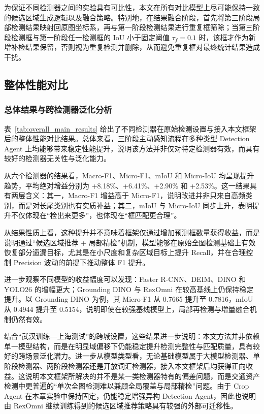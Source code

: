 为保证不同检测器之间的实验具有可比性，本文在所有对比模型上尽可能保持一致的候选区域生成逻辑以及融合策略。特别地，在结果融合阶段，首先将第三阶段局部检测结果映射回原图坐标系，再与第一阶段检测结果进行重复框筛除；当第三阶段检测框与第一阶段任一检测框的 IoU 小于固定阈值 $\tau_f=0.1$ 时，该框才作为新增补检结果保留，否则视为重复检测并删除，从而避免重复框对最终统计结果造成干扰。

\subsection{整体性能对比}
\label{sec:overall_comparison}

\subsubsection{总体结果与跨检测器泛化分析}

表~\ref{tab:overall_main_results} 给出了不同检测器在原始检测设置与接入本文框架后的整体性能对比结果。总体来看，三阶段主动感知流程在多种类型 Detection Agent 上均能够带来稳定性能提升，说明该方法并非仅对特定检测器有效，而具有较好的检测器无关性与泛化能力。

从六个检测器的结果看，Macro-F1、Micro-F1、mIoU 和 Micro-IoU 均呈现提升趋势，平均绝对增益分别为 +8.18\%、+6.41\%、+2.90\% 和 +2.53\%。这一结果具有两层含义：其一，Macro-F1 增益高于 Micro-F1，说明改进并非只来自高频类别，而是对长尾类别也有实质补益；其二，mIoU 与 Micro-IoU 同步上升，表明提升不仅体现在“检出来更多”，也体现在“框匹配更合理”。

从结果性质上看，这种提升并不意味着框架仅通过增加预测框数量获得收益，而是说明通过“候选区域推荐 + 局部精检”机制，模型能够在原始全图检测基础上有效恢复部分遗漏目标，尤其是在小尺度和复杂区域目标上提升 Recall，并在合理控制 Precision 波动的前提下推动整体 F1 提升。

进一步观察不同模型的收益幅度可以发现：Faster R-CNN、DEIM、DINO 和 YOLO26 的增幅更大；Grounding DINO 与 RexOmni 在较高基线上仍保持稳定提升。以 Grounding DINO 为例，其 Micro-F1 从 0.7665 提升至 0.7816，mIoU 从 0.4944 提升至 0.5154，说明即使在较强基线模型上，局部再检测与增量融合机制仍然有效。

结合“武汉训练—上海测试”的跨城设置，这些结果进一步说明：本文方法并非依赖单一模型结构，而是在明显域偏移下仍能稳定提升检测完整性与匹配质量，具有较好的跨场景泛化潜力。进一步从模型类型看，无论基础模型属于大模型检测器、单阶段检测器、两阶段检测器还是开放词汇检测器，接入本文框架后均获得正向收益。这说明本文框架所解决的并不是某一类检测器特有的偏差问题，而是交通资产检测中更普遍的“单次全图检测难以兼顾全局覆盖与局部精检”问题。由于 Crop Agent 在本章实验中保持固定，仍能稳定增强异构 Detection Agent，因此也说明由 RexOmni 继续训练得到的候选区域推荐策略具有较强的外部可迁移性。

